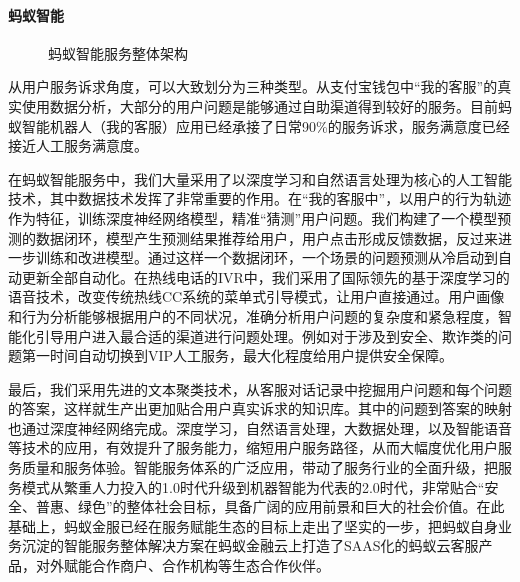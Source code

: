 \documentclass[letterpaper,11pt,english]{sphinxmanual}
\begin{document}
\paragraph{蚂蚁智能}
\label{\detokenize{chapter_company/antgroup:id3}}
\begin{figure}[H]
\centering
\capstart

\noindent{}
\caption{蚂蚁智能服务整体架构}\label{\detokenize{chapter_company/antgroup:id5}}\end{figure}

从用户服务诉求角度，可以大致划分为三种类型。从支付宝钱包中“我的客服”的真实使用数据分析，大部分的用户问题是能够通过自助渠道得到较好的服务。目前蚂蚁智能机器人（我的客服）应用已经承接了日常90\%的服务诉求，服务满意度已经接近人工服务满意度。

在蚂蚁智能服务中，我们大量采用了以深度学习和自然语言处理为核心的人工智能技术，其中数据技术发挥了非常重要的作用。在“我的客服中”，以用户的行为轨迹作为特征，训练深度神经网络模型，精准“猜测”用户问题。我们构建了一个模型预测的数据闭环，模型产生预测结果推荐给用户，用户点击形成反馈数据，反过来进一步训练和改进模型。通过这样一个数据闭环，一个场景的问题预测从冷启动到自动更新全部自动化。在热线电话的IVR中，我们采用了国际领先的基于深度学习的语音技术，改变传统热线CC系统的菜单式引导模式，让用户直接通过。用户画像和行为分析能够根据用户的不同状况，准确分析用户问题的复杂度和紧急程度，智能化引导用户进入最合适的渠道进行问题处理。例如对于涉及到安全、欺诈类的问题第一时间自动切换到VIP人工服务，最大化程度给用户提供安全保障。

最后，我们采用先进的文本聚类技术，从客服对话记录中挖掘用户问题和每个问题的答案，这样就生产出更加贴合用户真实诉求的知识库。其中的问题到答案的映射也通过深度神经网络完成。深度学习，自然语言处理，大数据处理，以及智能语音等技术的应用，有效提升了服务能力，缩短用户服务路径，从而大幅度优化用户服务质量和服务体验。智能服务体系的广泛应用，带动了服务行业的全面升级，把服务模式从繁重人力投入的1.0时代升级到机器智能为代表的2.0时代，非常贴合“安全、普惠、绿色”的整体社会目标，具备广阔的应用前景和巨大的社会价值。在此基础上，蚂蚁金服已经在服务赋能生态的目标上走出了坚实的一步，把蚂蚁自身业务沉淀的智能服务整体解决方案在蚂蚁金融云上打造了SAAS化的蚂蚁云客服产品，对外赋能合作商户、合作机构等生态合作伙伴。
%
\begin{footnote}[874]\sphinxAtStartFootnote
{}
%
\end{footnote}
\end{document}
